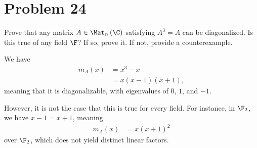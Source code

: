 \documentclass[8pt]{mypackage}
\begin{document}
\section{Problem 24}%
\begin{problem}
  Prove that any matrix $A\in \Mat_{n}\left(\C\right)$ satisfying $A^{3} = A$ can be diagonalized. Is this true of any field $\F$? If so, prove it. If not, provide a counterexample.
\end{problem}
\begin{solution}
  We have
  \begin{align*}
    m_{A}\left(x\right) &= x^{3} - x\\
                        &= x\left(x-1\right)\left(x+1\right),
  \end{align*}
  meaning that it is diagonalizable, with eigenvalues of $0$, $1$, and $-1$.\newline

  However, it is not the case that this is true for every field. For instance, in $\F_2$, we have $x-1 = x+1$, meaning
  \begin{align*}
    m_{A}(x) &= x\left(x+1\right)^2
  \end{align*}
  over $\F_2$, which does not yield distinct linear factors.
\end{solution}
\end{document}
